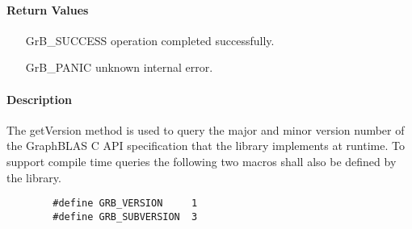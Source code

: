 \paragraph{Return Values}

\begin{itemize}[leftmargin=2.1in]
\item[{\sf GrB\_SUCCESS}]        operation completed successfully.
\item[{\sf GrB\_PANIC}]          unknown internal error.
\end{itemize}

\paragraph{Description}

The {\sf getVersion} method is used to query the major and minor version number of the
GraphBLAS C API specification that the library implements at runtime.  To
support compile time queries the following two macros shall also be defined by
the library.
\begin{verbatim}
        #define GRB_VERSION     1
        #define GRB_SUBVERSION  3
\end{verbatim}
